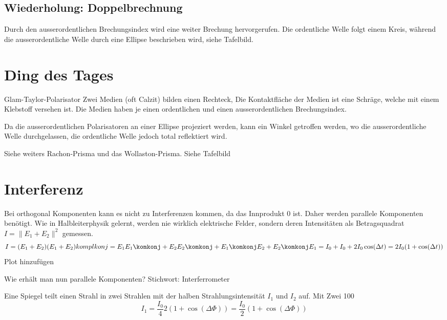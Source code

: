 \documentclass[a4paper]{article}
\begin{document}
\subsection*{Wiederholung: Doppelbrechnung}
Durch den ausserordentlichen Brechungsindex wird eine weiter Brechung hervorgerufen. Die ordentliche Welle folgt einem Kreis, während die ausserordentliche Welle durch eine Ellipse beschrieben wird, siehe Tafelbild.

\section*{Ding des Tages}
Glam-Taylor-Polarisator
Zwei Medien (oft Calzit) bilden einen Rechteck, Die Kontaktfläche der Medien ist eine Schräge, welche mit einem Klebstoff versehen ist. Die Medien haben je einen ordentlichen und einen ausserordentlichen Brechungsindex.

Da die ausserordentlichen Polarisatoren an einer Ellipse projeziert werden, kann ein Winkel getroffen werden, wo die ausserordentliche Welle durchgelassen, die ordentliche Welle jedoch total reflektiert wird.

Siehe weiters Rachon-Prisma und das Wollaston-Prisma. Siehe Tafelbild

\section*{Interferenz}
Bei orthogonal Komponenten kann es nicht zu Interferenzen kommen, da das Innprodukt 0 ist. Daher werden parallele Komponenten benötigt.
Wie in Halbleiterphysik gelernt, werden nie wirklich elektrische Felder, sondern deren Intensitäten als Betragsquadrat $I=\|E_{1}+E_{2}\|^{2}$ gemessen.
\[ I=(E_{1}+E_{2})(E_{1}+E_{2})komplkonj =  E_{1}E_{1}\komkonj +E_{2}E_{2}\komkonj + E_{1}\komkonj E_{2} + E_{2}\komkonj E_{1} = I_{0} + I_{0} + 2I_{0}\cos(\Delta t) = 2I_{0}(1+\cos(\Delta t))\]
Plot hinzufügen

Wie erhält man nun parallele Komponenten? Stichwort: Interferrometer

Eine Spiegel teilt einen Strahl in zwei Strahlen mit der halben Strahlungsintensität $I_{1}$ und $I_{2}$ auf. Mit Zwei 100%
\[ I_{1}=\frac{I_{0}}{4}2(1+\cos(\Delta \Phi))=\frac{I_{0}}{2}(1+\cos(\Delta \Phi)) \]
\end{document}
